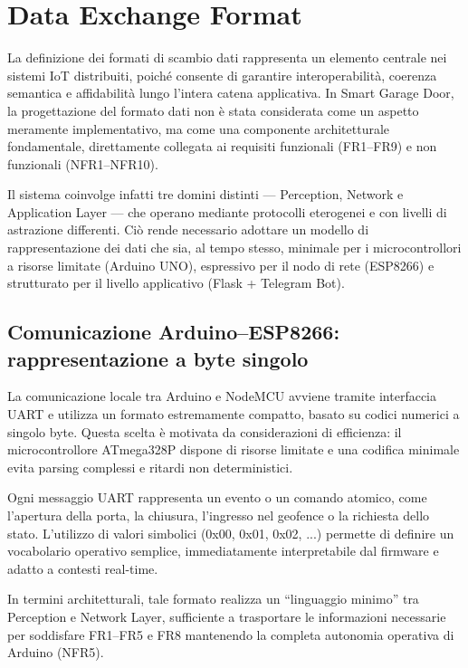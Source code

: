 \section{Data
Exchange Format}



La definizione dei formati di scambio
dati rappresenta un elemento centrale nei sistemi IoT distribuiti,
poiché consente di garantire interoperabilità, coerenza semantica e
affidabilità lungo l’intera catena applicativa. In Smart Garage
Door, la progettazione del formato dati non è stata considerata come
un aspetto meramente implementativo, ma come una componente
architetturale fondamentale, direttamente collegata ai requisiti
funzionali (FR1–FR9) e non funzionali (NFR1–NFR10).



Il
sistema coinvolge infatti tre domini distinti — Perception, Network
e Application Layer — che operano mediante protocolli eterogenei e
con livelli di astrazione differenti. Ciò rende necessario adottare
un modello di rappresentazione dei dati che sia, al tempo stesso,
minimale per i microcontrollori a risorse limitate (Arduino UNO),
espressivo per il nodo di rete (ESP8266) e strutturato per il livello
applicativo (Flask + Telegram Bot).



\subsection*{Comunicazione
Arduino–ESP8266: rappresentazione a byte singolo}

La
comunicazione locale tra Arduino e NodeMCU avviene tramite
interfaccia UART e utilizza un formato estremamente compatto, basato
su codici numerici a singolo byte. Questa scelta è motivata da
considerazioni di efficienza: il microcontrollore ATmega328P dispone
di risorse limitate e una codifica minimale evita parsing complessi e
ritardi non deterministici.



Ogni messaggio UART
rappresenta un evento o un comando atomico, come l'apertura della
porta, la chiusura, l’ingresso nel geofence o la richiesta dello
stato. L’utilizzo di valori simbolici (0x00, 0x01, 0x02, ...)
permette di definire un vocabolario operativo semplice,
immediatamente interpretabile dal firmware e adatto a contesti
real-time.



In termini architetturali, tale formato
realizza un “linguaggio minimo” tra Perception e Network Layer,
sufficiente a trasportare le informazioni necessarie per soddisfare
FR1–FR5 e FR8 mantenendo la completa autonomia operativa di Arduino
(NFR5).



